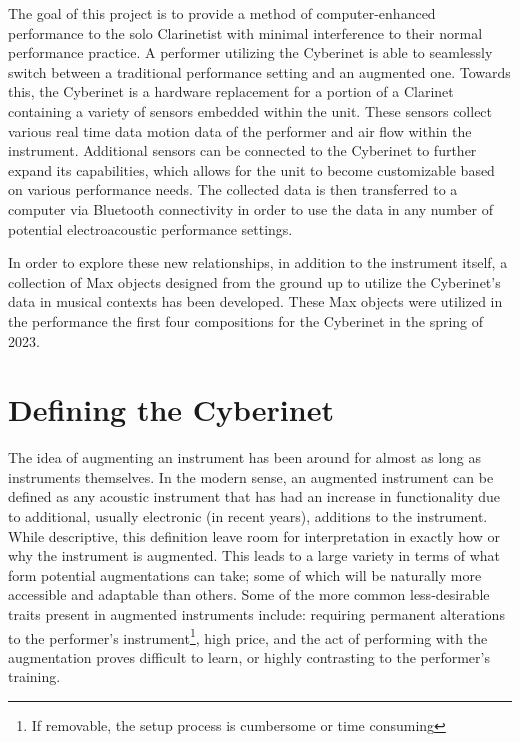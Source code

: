 The goal of this project is to provide a method of computer-enhanced performance to the solo Clarinetist with minimal interference to their normal performance practice. A performer utilizing the Cyberinet is able to seamlessly switch between a traditional performance setting and an augmented one. Towards this, the Cyberinet is a hardware replacement for a portion of a Clarinet containing a variety of sensors embedded within the unit. These sensors collect various real time data motion data of the performer and air flow within the instrument. Additional sensors can be connected to the Cyberinet to further expand its capabilities, which allows for the unit to become customizable based on various performance needs. The collected data is then transferred to a computer via Bluetooth connectivity in order to use the data in any number of potential electroacoustic performance settings. 

In order to explore these new relationships, in addition to the instrument itself, a collection of Max objects designed from the ground up to utilize the Cyberinet’s data in musical contexts has been developed. These Max objects were utilized in the performance the first four compositions for the Cyberinet in the spring of 2023.

\mainmatter
\chapter{Defining the Cyberinet} \label{ch:1}

The idea of augmenting an instrument has been around for almost as long as instruments themselves. In the modern sense, an augmented instrument can be defined as any acoustic instrument that has had an increase in functionality due to additional, usually electronic (in recent years), additions to the instrument\cite{miranda_Wanderley_instrumentControl_2006}. While descriptive, this definition leave room for interpretation in exactly how or why the instrument is augmented. This leads to a large variety in terms of what form potential augmentations can take; some of which will be naturally more accessible and adaptable than others. Some of the more common less-desirable traits present in augmented instruments include: requiring permanent alterations to the performer's instrument\footnote{If removable, the setup process is cumbersome or time consuming}, high price, and the act of performing with the augmentation proves difficult to learn, or highly contrasting to the performer's training. 

